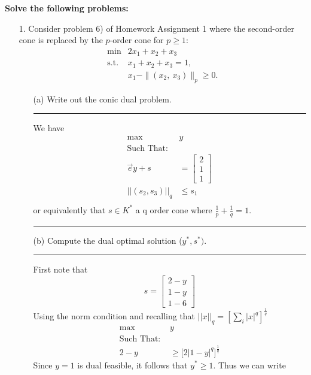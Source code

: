 \documentclass{article} %
\begin{document}
{\textbf{Solve the following problems:}}
\begin{enumerate}
\item[1.] Consider problem 6) of Homework Assignment 1 where the second-order cone is replaced by the $p$-order cone for $p\ge 1$:
\[\begin{array}{rl}
       \min        & 2x_1+x_2+x_3\\
    \mbox{s.t.} & x_1+x_2+x_3=1,\\
                      &x_1-\|(x_2,\ x_3)\|_{p}\ge 0.
  \end{array}
\]
\begin{itemize}
\item[(a)] Write out the conic dual problem.


\rule{\textwidth}{1pt}



We have 
\begin{equation*}
\begin{aligned}
\mbox{max } & y \\ 
\mbox{Such That: } & \\ 
\vec{e} y + s &= \begin{bmatrix} 2 \\ 1 \\ 1 \end{bmatrix} \\  
|| (s_2, s_3)||_{q} &\leq s_1  \\ 
\end{aligned}
\end{equation*}
or equivalently that $s \in K^*$ a q order cone where $ \frac{1}{p} + \frac{1}{q} = 1$. 

\rule{\textwidth}{1pt}

\item[(b)] Compute the dual optimal solution ($y^*,s^*)$.

\rule{\textwidth}{1pt}


First note that 
\[
s = \begin{bmatrix} 2 - y \\ 1 - y \\ 1- 6 \end{bmatrix}
\]
Using the norm condition and recalling that $ ||x ||_q = [\sum_{i} |x|^{q}]^{\frac{1}{q}}$
\begin{equation*}
\begin{aligned}
\mbox{max } & y \\ 
\mbox{Such That: } & \\ 
2 - y & \geq \big[ 2 | 1 - y|^q]^{\frac{1}{q}}
\end{aligned}
\end{equation*}
Since $ y = 1$ is dual feasible, it follows that $y^{*} \geq 1$. Thus we can write


\end{itemize}
\end{enumerate}
\end{document}
